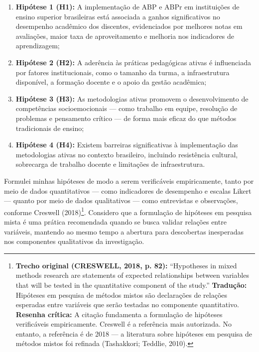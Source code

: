 \begin{enumerate}
    \item \textbf{Hipótese 1 (H1):} A implementação de ABP e ABPr em instituições de ensino superior brasileiras está associada a ganhos significativos no desempenho acadêmico dos discentes, evidenciados por melhores notas em avaliações, maior taxa de aproveitamento e melhoria nos indicadores de aprendizagem;
    \item \textbf{Hipótese 2 (H2):} A aderência às práticas pedagógicas ativas é influenciada por fatores institucionais, como o tamanho da turma, a infraestrutura disponível, a formação docente e o apoio da gestão acadêmica;
    \item \textbf{Hipótese 3 (H3):} As metodologias ativas promovem o desenvolvimento de competências socioemocionais — como trabalho em equipe, resolução de problemas e pensamento crítico — de forma mais eficaz do que métodos tradicionais de ensino;
    \item \textbf{Hipótese 4 (H4):} Existem barreiras significativas à implementação das metodologias ativas no contexto brasileiro, incluindo resistência cultural, sobrecarga de trabalho docente e limitações de infraestrutura.
\end{enumerate}

Formulei minhas hipóteses de modo a serem verificáveis empiricamente, tanto por meio de dados quantitativos — como indicadores de desempenho e escalas Likert — quanto por meio de dados qualitativos — como entrevistas e observações, conforme Creswell (2018)\footnote{\textbf{Trecho original (CRESWELL, 2018, p. 82):} ``Hypotheses in mixed methods research are statements of expected relationships between variables that will be tested in the quantitative component of the study.'' \textbf{Tradução:} Hipóteses em pesquisa de métodos mistos são declarações de relações esperadas entre variáveis que serão testadas no componente quantitativo. \textbf{Resenha crítica:} A citação fundamenta a formulação de hipóteses verificáveis empiricamente. Creswell é a referência mais autorizada. No entanto, a referência é de 2018 — a literatura sobre hipóteses em pesquisa de métodos mistos foi refinada (Tashakkori; Teddlie, 2010).}. Considero que a formulação de hipóteses em pesquisa mista é uma prática recomendada quando se busca validar relações entre variáveis, mantendo ao mesmo tempo a abertura para descobertas inesperadas nos componentes qualitativos da investigação.

